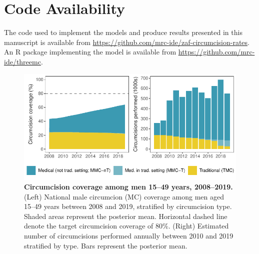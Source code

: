 \documentclass{article}
\begin{document}

\section*{Code Availability}


The code used to implement the models and produce results presented in this manuscript is available from \url{https://github.com/mrc-ide/zaf-circumcision-rates}. An R package implementing the model is available from \url{https://github.com/mrc-ide/threemc}.


\newpage 


\printbibliography

\newpage 
\begin{figure}[H]
  \centering
  \includegraphics[width = 5.2in]{Figures/paper/Figure1.pdf}
  \caption{{\bf Circumcision coverage among men 15--49 years, 2008--2019.}
    (Left) National male circumcion (MC) coverage among men aged 15--49 years between 2008 and 2019, stratified by circumcision type. Shaded areas represent the posterior mean. Horizontal dashed line denote the target circumcision coverage of 80\%. (Right) Estimated number of circumcisions performed annually between 2010 and 2019 stratified by type. Bars represent the posterior mean.}
  \label{fig::1549prev}
\end{figure}
\end{document}
